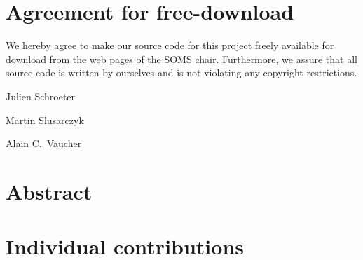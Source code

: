 \documentclass[11pt]{article}
\begin{document}

\newpage


\newpage
\section*{Agreement for free-download}
\bigskip


\bigskip


\large We hereby agree to make our source code for this project freely available for download from the web pages of the SOMS chair. Furthermore, we assure that all source code is written by ourselves and is not violating any copyright restrictions.

\begin{center}

\bigskip

\bigskip
\bigskip
\bigskip

\large Julien Schroeter
\bigskip
\bigskip
\bigskip
\bigskip

\large Martin Slusarczyk
\bigskip
\bigskip
\bigskip
\bigskip

\large Alain C.\ Vaucher






\end{center}
\newpage







\tableofcontents

\newpage




\section{Abstract}


\section{Individual contributions}

\end{document}

